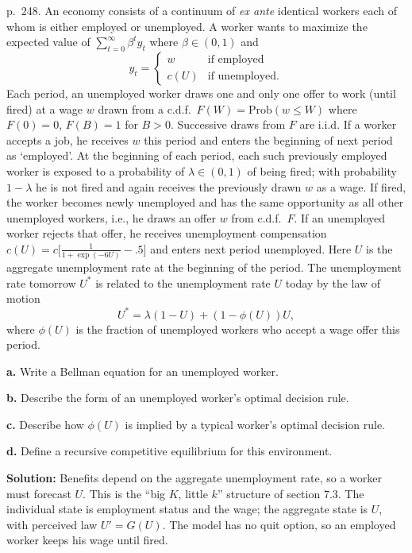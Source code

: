 \documentclass[12pt, letterpaper]{article}
\begin{document}
\begin{tcolorbox}[oddbox,title={Exercise 7.7 \quad Equilibrium search}]
\begin{tcolorbox}[questionbox]
p.~248. An economy consists of a continuum of \emph{ex ante} identical workers each of whom is either
employed or unemployed. A worker wants to maximize the expected value of $\sum_{t=0}^\infty\beta^ty_t$
where $\beta\in(0,1)$ and
\[
y_t=\begin{cases}w&\text{if employed}\\ c(U)&\text{if unemployed}.\end{cases}
\]
Each period, an unemployed worker draws one and only one offer to work (until fired) at a wage $w$
drawn from a c.d.f.\ $F(W)=\text{Prob}(w\le W)$ where $F(0)=0$, $F(B)=1$ for $B>0$. Successive draws
from $F$ are i.i.d. If a worker accepts a job, he receives $w$ this period and enters the beginning of
next period as `employed'. At the beginning of each period, each such previously employed worker is
exposed to a probability of $\lambda\in(0,1)$ of being fired; with probability $1-\lambda$ he is not
fired and again receives the previously drawn $w$ as a wage. If fired, the worker becomes newly
unemployed and has the same opportunity as all other unemployed workers, i.e., he draws an offer $w$
from c.d.f.\ $F$. If an unemployed worker rejects that offer, he receives unemployment compensation
$c(U)=c\big[\frac{1}{1+\exp(-6U)}-.5\big]$ and enters next period unemployed. Here $U$ is the
aggregate unemployment rate at the beginning of the period. The unemployment rate tomorrow $U^*$ is
related to the unemployment rate $U$ today by the law of motion
\[
U^*=\lambda(1-U)+(1-\phi(U))U,
\]
where $\phi(U)$ is the fraction of unemployed workers who accept a wage offer this period.

\textbf{a.} Write a Bellman equation for an unemployed worker.

\textbf{b.} Describe the form of an unemployed worker's optimal decision rule.

\textbf{c.} Describe how $\phi(U)$ is implied by a typical worker's optimal decision rule.

\textbf{d.} Define a recursive competitive equilibrium for this environment.
\end{tcolorbox}

\textbf{Solution:} Benefits depend on the aggregate unemployment rate, so a worker must forecast $U$.
This is the ``big $K$, little $k$'' structure of section 7.3. The individual state is employment
status and the wage; the aggregate state is $U$, with perceived law $U'=G(U)$. The model has no
quit option, so an employed worker keeps his wage until fired.


\end{tcolorbox}
\end{document}
